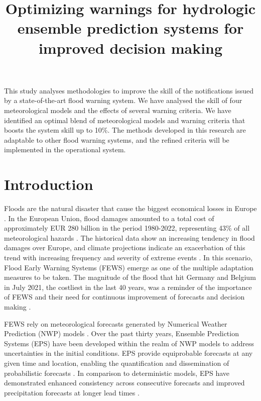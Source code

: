 \documentclass{ametsocV6.1}
\title{Optimizing warnings for hydrologic ensemble prediction systems for improved decision making}
\affiliation{\aff{a}{European Commission - Joint Research Centre, Ispra (Italy)}\\
\aff{b}{European Centre for Medium-Range Weather Forecasts, Reading (UK)}\\
\aff{c}{Swedish Meteorological and Hydrological Institute, Norrköping (Sweden)}\\
\aff{d}{Slovak Hydrometeorological Institute, Bratislava (Slovakia)}
}
\begin{document}
\maketitle


\statement

This study analyses methodologies to improve the skill of the notifications issued by a state-of-the-art flood warning system. We have analysed the skill of four meteorological models and the effects of several warning criteria. We have identified an optimal blend of meteorological models and warning criteria that boosts the system skill up to 10\%. The methods developed in this research are adaptable to other flood warning systems, and the refined criteria will be implemented in the operational system.



\section{Introduction}
\label{sec:introduction}

Floods are the natural disaster that cause the biggest economical losses in Europe \citep{WMO2021}. In the European Union, flood damages amounted to a total cost of approximately EUR 280 billion in the period 1980-2022, representing 43\% of all meteorological hazards \citep{EEA2023}. The historical data show an increasing tendency in flood damages over Europe, and climate projections indicate an exacerbation of this trend with increasing frequency and severity of extreme events \citep{EEA2023, Paprotny2018, Alfieri2017, IPCC2023}. In this scenario, Flood Early Warning Systems (FEWS) emerge as one of the multiple adaptation measures to be taken. The magnitude of the flood that hit Germany and Belgium in July 2021, the costliest in the last 40 years, was a reminder of the importance of FEWS and their need for continuous improvement of forecasts and decision making \citep{EEA2023}.

FEWS rely on meteorological forecasts generated by Numerical Weather Prediction (NWP) models \citep{Pagano2014}. Over the past thirty years, Ensemble Prediction Systems (EPS) have been developed within the realm of NWP models to address uncertainties in the initial conditions. EPS provide equiprobable forecasts at any given time and location, enabling the quantification and dissemination of probabilistic forecasts \citep{Cloke2009}. In comparison to deterministic models, EPS have demonstrated enhanced consistency across consecutive forecasts and improved precipitation forecasts at longer lead times \citep{Buizza2008, Molteni1996}.
\end{document}
